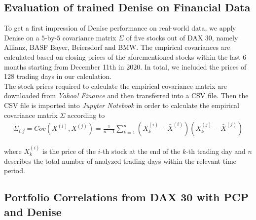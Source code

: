 \subsection{Evaluation of trained Denise on Financial Data}
To get a first impression of Denise performance on real-world data, we apply Denise on a $5$-by-$5$ covariance matrix $\Sigma$ of five stocks out of DAX 30, namely Allianz, BASF Bayer, Beiersdorf and BMW. The empirical covariances are calculated based on closing prices of the aforementioned stocks within the last 6 months starting from December 11th in 2020. In total, we included the prices of 128 trading days in our calculation.\\

The stock prices required to calculate the empirical covariance matrix are downloaded from \textit{Yahoo! Finance} and then transferred into a CSV file. Then the CSV file is imported into \textit{Jupyter Notebook} in order to calculate the empirical covariance matrix $\Sigma$ according to 
\begin{align}
\Sigma_{i,j} = Cov(X^{(i)},X^{(j)}) = \frac{1}{n-1} \sum_{k=1}^{n} (X_{k}^{(i)} - \bar{X}^{(i)}) (X_{k}^{(j)} - \bar{X}^{(j)})
\end{align}

where $X_{k}^{(i)}$ is the price of the $i$-th stock at the end of the $k$-th trading day and $n$ describes the total number of analyzed trading days within the relevant time period.


\subsection{Portfolio Correlations from DAX 30 with PCP and Denise}


